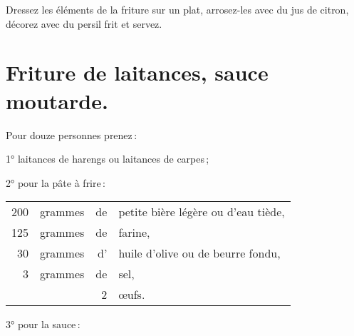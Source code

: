 Dressez les éléments de la friture sur un plat, arrosez-les avec du jus de
citron, décorez avec du persil frit et servez.

\section*{\centering Friture de laitances, sauce moutarde.}

Pour douze personnes prenez :

\medskip

1° {\mmm} laitances de harengs ou {\mmm} laitances de carpes ;

2° pour la pâte à frire :

\medskip

\footnotesize
\begin{longtable}{rrrp{16em}}
    200 & grammes & de & petite bière légère ou d'eau tiède,                                              \\
    125 & grammes & de & farine,                                                                          \\
     30 & grammes & d' & huile d'olive ou de beurre fondu,                                                \\
      3 & grammes & de & sel,                                                                             \\
        &         &  2 & œufs.                                                                            \\
\end{longtable}
\normalsize

3° pour la sauce :

